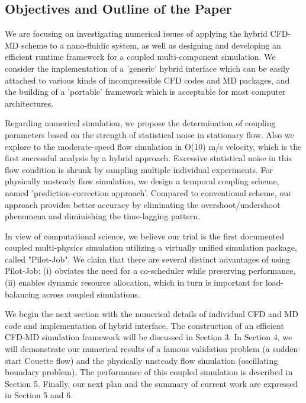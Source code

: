 \documentclass[preprint,12pt]{elsarticle}
\begin{document}
\subsection{Objectives and Outline of the Paper}

We are focusing on investigating numerical issues of applying the hybrid CFD-MD scheme to a nano-fluidic system, as well as designing and developing an efficient runtime framework for a coupled multi-component simulation. We consider the implementation of a 'generic' hybrid interface which can be easily attached to various kinds of incompressible CFD codes and MD packages, and the building of a 'portable' framework which is acceptable for most computer architectures. 

Regarding numerical simulation, we propose the determination of coupling parameters based on the strength of statistical noise in stationary flow. Also we explore to the moderate-speed flow simulation in O(10) m/s velocity, which is the first successful analysis by a hybrid approach. Excessive statistical noise in this flow condition is shrunk by sampling multiple individual experiments. For physically unsteady flow simulation, we design a temporal coupling scheme, named 'prediction-correction approach'. Compared to conventional scheme, our approach provides better accuracy by eliminating the overshoot/undershoot phenomena and diminishing the time-lagging pattern.

In view of computational science, we believe our trial is the first documented coupled multi-physics simulation utilizing a virtually unified simulation package, called "Pilot-Job". We claim that there are several distinct advantages of using Pilot-Job: (i) obviates the need for a co-scheduler while preserving performance, (ii) enables dynamic resource allocation, which in turn is important for load-balancing across coupled simulations. %

We begin the next section with the numerical details of individual CFD and MD code and implementation of hybrid interface. The construction of an efficient CFD-MD simulation framework will be discussed in Section 3. In Section 4, we will demonstrate our numerical results of a famous validation problem (a sudden-start Couette flow) and the physically unsteady flow simulation (oscillating boundary problem). The performance of this coupled simulation is described in Section 5. Finally, our next plan and the summary of current work are expressed in Section 5 and 6.
\end{document}
